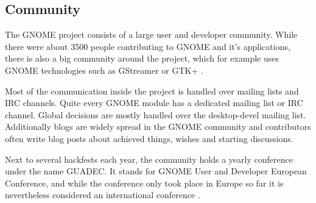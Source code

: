 
\subsection{Community} %

The GNOME project consists of a large user and developer community. While there
were about 3500 people contributing to GNOME and it's applications, there is
also a big community around the project, which for example uses GNOME
technologies such as GStreamer or GTK+ \cite{GNOMEAbout,GNOMETeams}.

Most of the communication inside the project is handled over mailing lists and
\ac{IRC} channels. Quite every GNOME module has a dedicated mailing list or
\ac{IRC} channel. Global decisions are mostly handled over the desktop-devel
mailing list. Additionally blogs are widely spread in the GNOME community and
contributors often write blog posts about achieved things, wishes and starting
discussions.

Next to several hackfests each year, the community holds a yearly conference
under the name GUADEC. It stands for GNOME User and Developer European
Conference, and while the conference only took place in Europe so far it is
nevertheless considered an international conference \cite{GNOMEGUADEC}.

